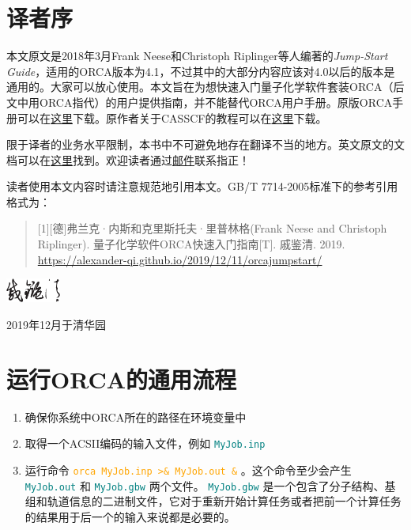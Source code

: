 \documentclass{ctexart}
\newcommand{\cmd}[1]{ \textcolor{orange}{\texttt{#1}} }
\newcommand{\file}[1]{ \textcolor{teal}{\texttt{#1}} }
\begin{document}
	


	\section*{译者序}
	本文原文是2018年3月Frank Neese和Christoph Riplinger等人编著的\textit{Jump-Start Guide}，适用的ORCA版本为4.1，不过其中的大部分内容应该对4.0以后的版本是通用的。大家可以放心使用。本文旨在为想快速入门量子化学软件套装ORCA（后文中用ORCA指代）的用户提供指南，并不能替代ORCA用户手册。原版ORCA手册可以在\href{https://hostr.co/ElQbdeKxt5jQ}{这里}下载。原作者关于CASSCF的教程可以在\href{https://hostr.co/0y7fujk5KEAa}{这里}下载。
	
	限于译者的业务水平限制，本书中不可避免地存在翻译不当的地方。英文原文的文档可以在\href{https://hostr.co/i613jRFj7YNo}{这里}找到。欢迎读者通过\href{mailto:alexanderqi126@outlook.com}{邮件}联系指正！
		
	读者使用本文内容时请注意规范地引用本文。GB/T 7714-2005标准下的参考引用格式为：
	\begin{quotation}
	[1][德]弗兰克·内斯和克里斯托夫·里普林格(Frank Neese and Christoph Riplinger). 量子化学软件ORCA快速入门指南[T]. 戚鉴清. 2019. \url{https://alexander-qi.github.io/2019/12/11/orcajumpstart/}	
	\end{quotation}
	
	
	
	\begin{flushright}
		\includegraphics[width=1.8cm]{sign.eps}
		
		2019年12月于清华园
	\end{flushright}
	\newpage

			\tableofcontents
			\newpage
	
	\section{运行ORCA的通用流程}
	\begin{enumerate}[1.]
		\item 确保你系统中ORCA所在的路径在环境变量中
		\item 取得一个ACSII编码的输入文件，例如\file{MyJob.inp}
		\item 运行命令\cmd{orca MyJob.inp >\& MyJob.out \&}。这个命令至少会产生\file{MyJob.out}和\file{MyJob.gbw}两个文件。\file{MyJob.gbw}是一个包含了分子结构、基组和轨道信息的二进制文件，它对于重新开始计算任务或者把前一个计算任务的结果用于后一个的输入来说都是必要的。
	\end{enumerate}
	
\end{document}

